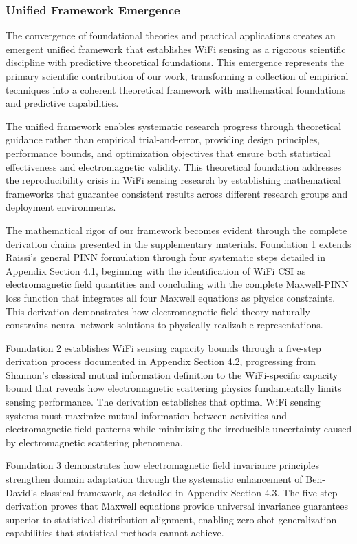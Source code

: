 \documentclass[journal]{IEEEtran}
\begin{document}
\subsubsection{Unified Framework Emergence}

The convergence of foundational theories and practical applications creates an emergent unified framework that establishes WiFi sensing as a rigorous scientific discipline with predictive theoretical foundations. This emergence represents the primary scientific contribution of our work, transforming a collection of empirical techniques into a coherent theoretical framework with mathematical foundations and predictive capabilities.

The unified framework enables systematic research progress through theoretical guidance rather than empirical trial-and-error, providing design principles, performance bounds, and optimization objectives that ensure both statistical effectiveness and electromagnetic validity. This theoretical foundation addresses the reproducibility crisis in WiFi sensing research by establishing mathematical frameworks that guarantee consistent results across different research groups and deployment environments.

The mathematical rigor of our framework becomes evident through the complete derivation chains presented in the supplementary materials. Foundation 1 extends Raissi's general PINN formulation through four systematic steps detailed in Appendix Section 4.1, beginning with the identification of WiFi CSI as electromagnetic field quantities and concluding with the complete Maxwell-PINN loss function that integrates all four Maxwell equations as physics constraints. This derivation demonstrates how electromagnetic field theory naturally constrains neural network solutions to physically realizable representations.

Foundation 2 establishes WiFi sensing capacity bounds through a five-step derivation process documented in Appendix Section 4.2, progressing from Shannon's classical mutual information definition to the WiFi-specific capacity bound that reveals how electromagnetic scattering physics fundamentally limits sensing performance. The derivation establishes that optimal WiFi sensing systems must maximize mutual information between activities and electromagnetic field patterns while minimizing the irreducible uncertainty caused by electromagnetic scattering phenomena.

Foundation 3 demonstrates how electromagnetic field invariance principles strengthen domain adaptation through the systematic enhancement of Ben-David's classical framework, as detailed in Appendix Section 4.3. The five-step derivation proves that Maxwell equations provide universal invariance guarantees superior to statistical distribution alignment, enabling zero-shot generalization capabilities that statistical methods cannot achieve.
\end{document}
